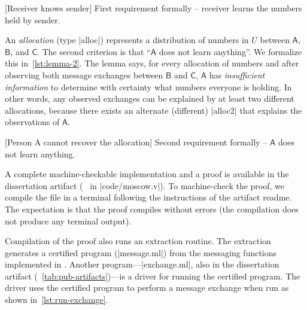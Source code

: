 \begin{center}
\begin{minipage}{\textwidth}
\captionsetup{type=lstlisting}
[Receiver knows sender]{
   First requirement formally -- receiver learns the numbers held by sender.}
\label{lst:lemma-1}
\end{minipage}
\end{center}

An \emph{allocation} (type \pr|alloc|) represents a distribution of numbers in
\(U\) between \(\mathsf{A}\), \(\mathsf{B}\), and \(\mathsf{C}\). The second
criterion is that \enquote{\(\mathsf{A}\) does not learn anything}. We formalize
this in~\autoref{lst:lemma-2}. The lemma says, for every allocation of numbers
and after observing both message exchanges between \(\mathsf{B}\) and
\(\mathsf{C}\), \(\mathsf{A}\) has \emph{insufficient information} to determine
with certainty what numbers everyone is holding. In other words, any observed
exchanges can be explained by at least two different allocations, because there
exists an alternate (different) \pr|alloc2| that explains the observations of
\(\mathsf{A}\).

\begin{center}
\begin{minipage}{\textwidth}
\captionsetup{type=lstlisting}
[Person A cannot recover the allocation]
{Second requirement formally -- \(\mathsf{A}\) does not learn anything.}
\label{lst:lemma-2}
\end{minipage}
\end{center}

A complete machine-checkable implementation and a proof is available in the
dissertation artifact (\cf~ in \pr|code/moscow.v|). To
machine-check the proof, we compile the file in a terminal following the
instructions of the artifact readme. The expectation is that the proof compiles
without errors (the compilation does not produce any terminal output).

Compilation of the proof also runs an extraction routine. The extraction
generates a certified  program (\pr|message.ml|) from the messaging
functions implemented in . Another program---\pr|exchange.ml|,
also in the dissertation artifact (\cf~\autoref{tab:pub-artifacts})---is a
{driver} for running the certified program. The driver uses the certified
program to perform a message exchange when run as shown
in~\autoref{lst:run-exchange}.

